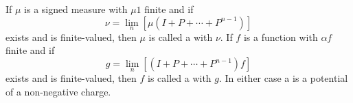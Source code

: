 If $\mu$ is a signed measure with $\mu 1$ finite and if
$$\nu = \lim_n [\mu(I + P + \cdots + P^{n-1})]$$
exists and is finite-valued, then $\mu$ is called a  with  $\nu$. If $f$ is a function with $\alpha f$ finite and if
$$g = \lim_n [(I + P + \cdots + P^{n-1})f]$$
exists and is finite-valued, then $f$ is called a  with  $g$. In either case a  is a potential of a non-negative charge.
